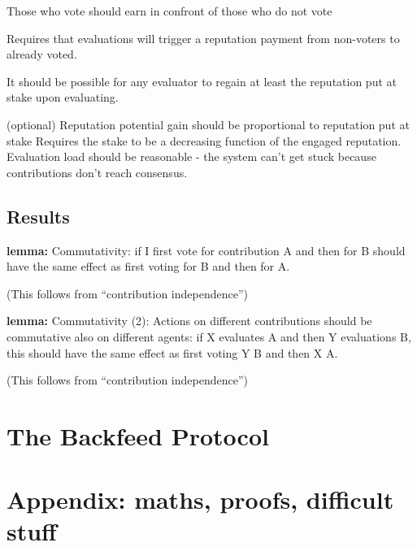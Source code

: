 \documentclass{article}
\begin{document}
Those who vote should earn in confront of those who do not vote

Requires that evaluations will trigger a reputation payment from non-voters to already voted.

It should be possible for any evaluator to regain at least the reputation put at stake upon evaluating.

(optional) Reputation potential gain should be proportional to reputation put at stake
Requires the stake to be a decreasing function of the engaged reputation.
Evaluation load should be reasonable - the system can’t get stuck because contributions don’t reach consensus.

\subsection{Results}


{\bf lemma:}
Commutativity: if I first vote for contribution A and then for B should have the same effect as first voting for B and then for A.

(This follows from ``contribution independence'')


{\bf lemma:}
Commutativity (2): Actions on different contributions should be commutative also on different agents: if X evaluates A and then Y evaluations B, this should have the same effect as first voting Y B and then X A.

(This follows from ``contribution independence'')

\section{The Backfeed Protocol}

\section{Appendix: maths, proofs, difficult stuff}
\end{document}
